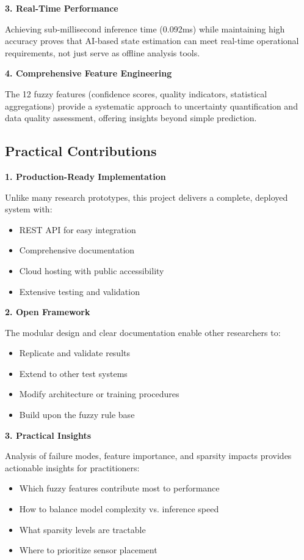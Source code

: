 \documentclass[12pt,a4paper]{report}
\begin{document}
\textbf{3. Real-Time Performance}

Achieving sub-millisecond inference time (0.092ms) while maintaining high accuracy proves that AI-based state estimation can meet real-time operational requirements, not just serve as offline analysis tools.

\textbf{4. Comprehensive Feature Engineering}

The 12 fuzzy features (confidence scores, quality indicators, statistical aggregations) provide a systematic approach to uncertainty quantification and data quality assessment, offering insights beyond simple prediction.

\subsection{Practical Contributions}

\textbf{1. Production-Ready Implementation}

Unlike many research prototypes, this project delivers a complete, deployed system with:
\begin{itemize}
    \item REST API for easy integration
    \item Comprehensive documentation
    \item Cloud hosting with public accessibility
    \item Extensive testing and validation
\end{itemize}

\textbf{2. Open Framework}

The modular design and clear documentation enable other researchers to:
\begin{itemize}
    \item Replicate and validate results
    \item Extend to other test systems
    \item Modify architecture or training procedures
    \item Build upon the fuzzy rule base
\end{itemize}

\textbf{3. Practical Insights}

Analysis of failure modes, feature importance, and sparsity impacts provides actionable insights for practitioners:
\begin{itemize}
    \item Which fuzzy features contribute most to performance
    \item How to balance model complexity vs. inference speed
    \item What sparsity levels are tractable
    \item Where to prioritize sensor placement
\end{itemize}
\end{document}
